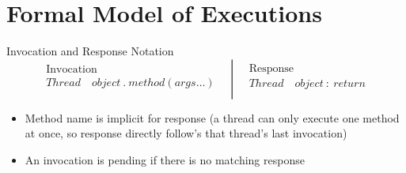 \section{Formal Model of Executions}

\begin{definitionbox}{Invocation and Response Notation}
	\[\left. \begin{matrix}
			\text{Invocation}                            \\
			Thread \quad object \ . \ method(args \dots) \\
		\end{matrix} \quad \right\lvert \quad \begin{matrix}
			\text{Response}                  \\
			Thread \quad object \ : \ return \\
		\end{matrix}\]
	\begin{itemize}
		\item Method name is implicit for response (a thread can only execute one method at once, so response directly follow's that thread's last invocation)
		\item An invocation is pending if there is no matching response
	\end{itemize}
\end{definitionbox}
